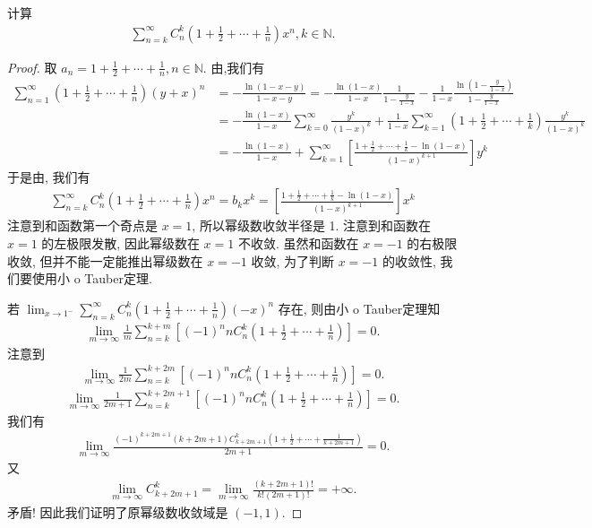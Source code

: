 \documentclass[../../main.tex]{subfiles}
\begin{document}
\begin{example}
计算
\begin{align*}
\sum_{n=k}^{\infty} C_n^k \left(1 + \frac{1}{2} + \cdots + \frac{1}{n}\right) x^n, k \in \mathbb{N}. 
\end{align*}
\end{example}
\begin{proof}
取 $a_n = 1 + \frac{1}{2} + \cdots + \frac{1}{n}, n \in \mathbb{N}$. 由,我们有
\begin{align*}
\sum_{n=1}^{\infty} \left(1 + \frac{1}{2} + \cdots + \frac{1}{n}\right) (y + x)^n &= -\frac{\ln(1 - x - y)}{1 - x - y} = -\frac{\ln(1 - x)}{1 - x} \frac{1}{1 - \frac{y}{1 - x}} - \frac{1}{1 - x} \frac{\ln\left(1 - \frac{y}{1 - x}\right)}{1 - \frac{y}{1 - x}} \\
&= -\frac{\ln(1 - x)}{1 - x} \sum_{k=0}^{\infty} \frac{y^k}{(1 - x)^k} + \frac{1}{1 - x} \sum_{k=1}^{\infty} \left(1 + \frac{1}{2} + \cdots + \frac{1}{k}\right) \frac{y^k}{(1 - x)^k} \\
&= -\frac{\ln(1 - x)}{1 - x} + \sum_{k=1}^{\infty} \left[\frac{1 + \frac{1}{2} + \cdots + \frac{1}{k} - \ln(1 - x)}{(1 - x)^{k + 1}}\right] y^k
\end{align*}
于是由, 我们有
\begin{align*}
\sum_{n=k}^{\infty} C_n^k \left(1 + \frac{1}{2} + \cdots + \frac{1}{n}\right) x^n = b_k x^k = \left[\frac{1 + \frac{1}{2} + \cdots + \frac{1}{k} - \ln(1 - x)}{(1 - x)^{k + 1}}\right] x^k 
\end{align*}
注意到和函数第一个奇点是 $x = 1$, 所以幂级数收敛半径是 1. 注意到和函数在 $x = 1$ 的左极限发散, 因此幂级数在 $x = 1$ 不收敛. 虽然和函数在 $x = -1$ 的右极限收敛, 但并不能一定能推出幂级数在 $x = -1$ 收敛, 为了判断 $x = -1$ 的收敛性, 我们要使用小 o Tauber定理.

若 $\lim_{x \to 1^-} \sum_{n=k}^{\infty} C_n^k \left(1 + \frac{1}{2} + \cdots + \frac{1}{n}\right) (-x)^n$ 存在, 则由小 o Tauber定理知
\begin{align*}
\lim_{m \to \infty} \frac{1}{m} \sum_{n=k}^{k + m} \left[(-1)^n n C_n^k \left(1 + \frac{1}{2} + \cdots + \frac{1}{n}\right)\right] = 0 .
\end{align*}
注意到
\begin{align*}
\lim_{m \to \infty} \frac{1}{2m} \sum_{n=k}^{k + 2m} \left[(-1)^n n C_n^k \left(1 + \frac{1}{2} + \cdots + \frac{1}{n}\right)\right] = 0.
\end{align*}
\begin{align*}
\lim_{m \to \infty} \frac{1}{2m + 1} \sum_{n=k}^{k + 2m + 1} \left[(-1)^n n C_n^k \left(1 + \frac{1}{2} + \cdots + \frac{1}{n}\right)\right] = 0 .
\end{align*}
我们有
\begin{align*}
\lim_{m \to \infty} \frac{(-1)^{k + 2m + 1} (k + 2m + 1) C_{k + 2m + 1}^k \left(1 + \frac{1}{2} + \cdots + \frac{1}{k + 2m + 1}\right)}{2m + 1} = 0.
\end{align*}
又
\begin{align*}
\lim_{m \to \infty} C_{k + 2m + 1}^k = \lim_{m \to \infty} \frac{(k + 2m + 1)!}{k! (2m + 1)!} = +\infty .
\end{align*}
矛盾! 因此我们证明了原幂级数收敛域是 $(-1, 1)$.
\end{proof}
\end{document}
